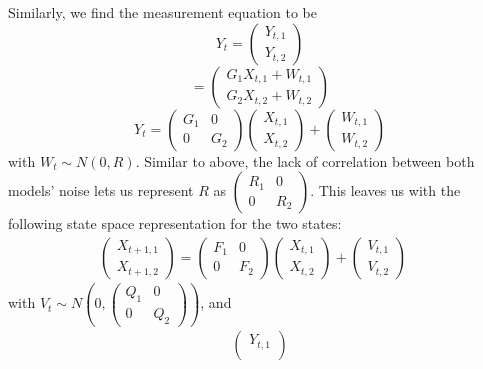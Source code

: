 \documentclass{article}
\begin{document}
{\[\]
Similarly, we find the measurement equation to be 
\[
  Y_t = \begin{pmatrix}
    Y_{t,1} \\
    Y_{t,2}
  \end{pmatrix}
\]
\[
  = \begin{pmatrix}
    G_1 X_{t,1} + W_{t,1} \\
    G_2 X_{t,2} + W_{t,2}
  \end{pmatrix}
\]
\[
  Y_t = \begin{pmatrix}
    G_1 & 0 \\
    0 & G_2 
  \end{pmatrix}
  \begin{pmatrix}
    X_{t,1} \\
    X_{t,2}
  \end{pmatrix} + 
  \begin{pmatrix}
    W_{t,1} \\
    W_{t,2}
  \end{pmatrix}
\]
with \(W_t \sim N(0, R)\). Similar to above, the lack of correlation between both models' noise lets us represent \(R\) as \(\begin{pmatrix}
  R_1 & 0 \\
  0 & R_2
\end{pmatrix}\). This leaves us with the following state space representation for the two states:
\begin{align*}
  \begin{pmatrix}
    X_{t+1,1} \\
    X_{t+1,2}
  \end{pmatrix} = 
  \begin{pmatrix}
    F_1 & 0 \\
    0 & F_2   
  \end{pmatrix} 
  \begin{pmatrix}
    X_{t,1} \\
    X_{t,2}  
  \end{pmatrix} + 
  \begin{pmatrix}
    V_{t,1} \\
    V_{t,2}
  \end{pmatrix}
  \quad 
\end{align*}
with \(V_t \sim N(0, \begin{pmatrix}
  Q_1 & 0 \\
  0 & Q_2
\end{pmatrix}) \), and 
\begin{align*}
  \begin{pmatrix}
    Y_{t,1} \\ 

\end{pmatrix}
\end{align*}}
\end{document}
